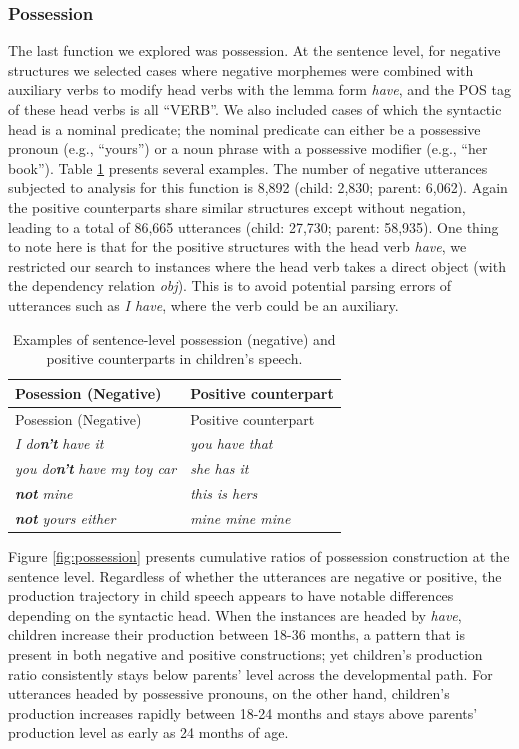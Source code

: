 \documentclass[
  man,floatsintext]{apa6}
\begin{document}
\hypertarget{possession}{%
\subsubsection{Possession}\label{possession}}

The last function we explored was possession. At the sentence level, for negative structures we selected cases where negative morphemes were combined with auxiliary verbs to modify head verbs with the lemma form \emph{have}, and the POS tag of these head verbs is all ``VERB''. We also included cases of which the syntactic head is a nominal predicate; the nominal predicate can either be a possessive pronoun (e.g., ``yours'') or a noun phrase with a possessive modifier (e.g., ``her book''). Table \ref{tab:possess} presents several examples. The number of negative utterances subjected to analysis for this function is 8,892 (child: 2,830; parent: 6,062). Again the positive counterparts share similar structures except without negation, leading to a total of 86,665 utterances (child: 27,730; parent: 58,935). One thing to note here is that for the positive structures with the head verb \emph{have}, we restricted our search to instances where the head verb takes a direct object (with the dependency relation \emph{obj}). This is to avoid potential parsing errors of utterances such as \emph{I have}, where the verb could be an auxiliary.

\begin{longtable}[]{@{}ll@{}}
\caption{\label{tab:possess} Examples of sentence-level possession (negative) and positive counterparts in children's speech.}\tabularnewline
\toprule\noalign{}
Posession (Negative) & Positive counterpart \\
\midrule\noalign{}
\endfirsthead
\toprule\noalign{}
Posession (Negative) & Positive counterpart \\
\midrule\noalign{}
\endhead
\bottomrule\noalign{}
\endlastfoot
\emph{I do\textbf{n't}} \emph{have it} & \emph{you have that} \\
\emph{you do\textbf{n't}} \emph{have my toy car} & \emph{she has it} \\
\textbf{\emph{not}} \emph{mine} & \emph{this is hers} \\
\textbf{\emph{not}} \emph{yours either} & \emph{mine mine mine} \\
\end{longtable}

Figure \ref{fig:possession} presents cumulative ratios of possession construction at the sentence level. Regardless of whether the utterances are negative or positive, the production trajectory in child speech appears to have notable differences depending on the syntactic head. When the instances are headed by \emph{have}, children increase their production between 18-36 months, a pattern that is present in both negative and positive constructions; yet children's production ratio consistently stays below parents' level across the developmental path. For utterances headed by possessive pronouns, on the other hand, children's production increases rapidly between 18-24 months and stays above parents' production level as early as 24 months of age.
\end{document}

